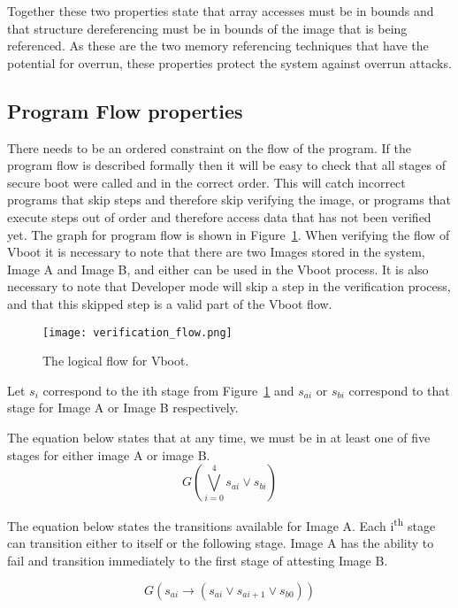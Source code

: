 Together these two properties state that array accesses must be in bounds and that structure dereferencing must be in bounds of the image that is being referenced.
As these are the two memory referencing techniques that have the potential for overrun, these properties protect the system against overrun attacks.

\subsection{Program Flow properties}


There needs to be an ordered constraint on the flow of the program. 
If the program flow is described formally then it will be easy to check that all stages of secure boot were called and in the correct order.
This will catch incorrect programs that skip steps and therefore skip verifying the image, or programs that execute steps out of order and therefore access data that has not been verified yet.
The graph for program flow is shown in Figure~\ref{fig:v_flow}.
When verifying the flow of Vboot it is necessary to note that there are two Images stored in the system, Image A and Image B, and either can be used in the Vboot process. 
It is also necessary to note that Developer mode will skip a step in the verification process, and that this skipped step is a valid part of the Vboot flow.

\begin{figure}[!htbp]
  \centering
  \texttt{[image: verification\_flow.png]}
  \caption[Verified Boot Program Flow]{The logical flow for Vboot.}\label{fig:v_flow}
\end{figure}

Let $s_i$ correspond to the ith stage from Figure~\ref{fig:v_flow} and $s_{ai}$ or $s_{bi}$ correspond to that stage for Image A or Image B respectively.

The equation below states that at any time, we must be in at least one of five stages for either image A or image B.
\begin{equation}
    G(\bigvee\limits_{i = 0}^{4} s_{ai} \lor s_{bi})
\end{equation}

The equation below states the transitions available for Image A.
Each i\textsuperscript{th} stage can transition either to itself or the following stage.
Image A has the ability to fail and transition immediately to the first stage of attesting Image B.

\begin{equation}
    G(s_{ai} \to (s_{ai} \lor s_{ai+1} \lor s_{b0}))
\end{equation}

